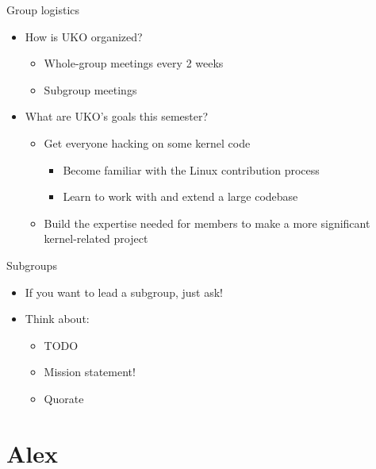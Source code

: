 \documentclass[aspectratio=169, notes]{beamer}
\begin{document}
\begin{frame}{Group logistics}
	\begin{itemize}
	\item How is UKO organized?
		\begin{itemize}
		\item Whole-group meetings every 2 weeks
		\item Subgroup meetings
		\end{itemize}
	\item What are UKO's goals this semester?
		\begin{itemize}
		\item Get everyone hacking on some kernel code
			\begin{itemize}
			\item Become familiar with the Linux contribution process
			\item Learn to work with and extend a large codebase
			\end{itemize}
		\item Build the expertise needed for members to make a more significant kernel-related project
		\end{itemize}
	\end{itemize}
\end{frame}

\begin{frame}{Subgroups}
	\begin{itemize}
	\item If you want to lead a subgroup, just ask!
	\item Think about:
		\begin{itemize}
		\item TODO
		\item Mission statement!
		\item Quorate
		\end{itemize}
	\end{itemize}
\end{frame}

\section{Alex}
\end{document}
